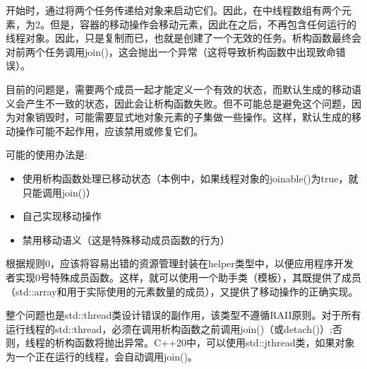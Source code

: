 开始时，通过将两个任务传递给对象来启动它们。因此，在中线程数组有两个元素，为2。但是，容器的移动操作会移动元素，因此在之后，不再包含任何运行的线程对象。因此，只是复制而已，也就是创建了一个无效的任务。析构函数最终会对前两个任务调用join()，这会抛出一个异常（这将导致析构函数中出现致命错误）。

目前的问题是，需要两个成员一起才能定义一个有效的状态，而默认生成的移动语义会产生不一致的状态，因此会让析构函数失败。但不可能总是避免这个问题，因为对象销毁时，可能需要显式地对象元素的子集做一些操作。这样，默认生成的移动操作可能不起作用，应该禁用或修复它们。

可能的使用办法是:

\begin{itemize}
	\item 使用析构函数处理已移动状态（本例中，如果线程对象的joinable()为true，就只能调用join()）
	\item 自己实现移动操作
	\item 禁用移动语义（这是特殊移动成员函数的行为）
\end{itemize}

根据规则0，应该将容易出错的资源管理封装在helper类型中，以便应用程序开发者实现0号特殊成员函数。这样，就可以使用一个助手类（模板），其既提供了成员（std::array和用于实际使用的元素数量的成员），又提供了移动操作的正确实现。

整个问题也是std::thread类设计错误的副作用，该类型不遵循RAII原则。对于所有运行线程的std::thread，必须在调用析构函数之前调用join()（或detach()）;否则，线程的析构函数将抛出异常。C++20中，可以使用std::jthread类，如果对象为一个正在运行的线程，会自动调用join()。




















